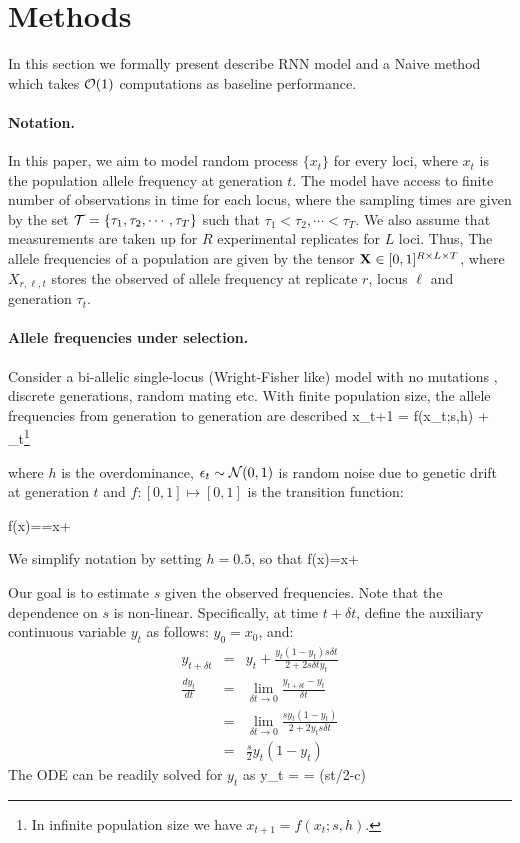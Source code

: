 \section{Methods}
In this section we formally present describe RNN model and a Naive method which takes ${\cal O}(1)$ computations as baseline performance.

\paragraph{Notation.}
In this paper, we aim to model random process $\{x_t\}$ for every loci, where  $x_t$ is the population allele frequency at generation $t$. The model have access to finite number of observations in time for each locus, where the sampling times are given by the set ${\cal T}=\{\tau_1,\tau_2,\cdots, \tau_T \}$ such that $\tau_1<\tau_2,\cdots<\tau_T$. We also assume that measurements are taken up for $R$ experimental replicates for $L$ loci. Thus, The allele frequencies of a population are given by the tensor ${\mathbf X}
\in [0,1]^{R \times L \times T}$, where $X_{r,\ell,t}$ stores the
observed of allele frequency at replicate $r$, locus $\ell$ and generation $\tau_t$.

\paragraph{Allele frequencies under selection.}
Consider a bi-allelic single-locus (Wright-Fisher like) model with no
mutations \cite{book-mathpopgen}, discrete generations, random mating
etc. With finite population size, the allele frequencies from
generation to generation are described 
\beq\label{eq:trans0}
x_{t+1} = f(x_t;s,h)  + \epsilon_t\footnote{In infinite population
  size we have $x_{t+1} = f(x_t;s,h)$.} 
\eeq

where $h$ is the overdominance, $\epsilon_t \sim {\cal N}(0,1)$ is random noise due to
genetic drift at generation $t$ and $f: [0,1] \mapsto [0,1]$ is the
transition function:

\beq
f(x)==x+
\eeq

We simplify notation by setting $h=0.5$, so that
\beq
f(x)=x+
\eeq

Our goal is to estimate $s$ given the observed frequencies. Note that
the dependence on $s$ is non-linear. Specifically, at time $t+\delta
t$, define the auxiliary continuous variable $y_t$ as follows:
$y_0=x_0$, and:
\begin{eqnarray}
  y_{t+\delta t} &=& y_t+\frac{y_t(1-y_t)s\delta t}{2+2s\delta t y_t}\\
  \frac{dy_t}{dt} &=&\lim_{\delta t\rightarrow 0}\frac{y_{t+\delta t} -y_t}{\delta t}\\
   &=&\lim_{\delta t\rightarrow 0}\frac{sy_t(1-y_t)}{2+2y_ts\delta t}\\
   &=& \frac{s}{2}y_t(1-y_t) 
  \label{eq:ode}
\end{eqnarray}
The ODE can be readily solved for $y_t$ as
\beq
y_t = = \sigma(st/2-c) 
\label{eq:inf-pop} 
\eeq

